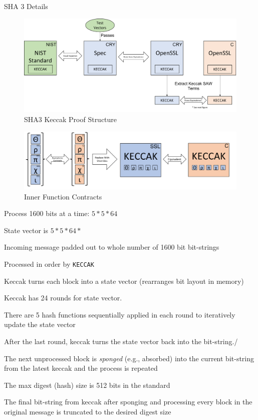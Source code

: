 SHA 3 Details
\begin{figure}[ht]
  \centering
  \includegraphics[width=\linewidth]{figs/proof.png}
  
  \caption{SHA3 Keccak Proof Structure}
  \label{fig:proofStructure}
  
\end{figure}
\begin{figure}[ht]
  \centering
  \includegraphics[width=\linewidth]{figs/proof2.png}
  
  \caption{Inner Function Contracts}
  \label{fig:proofStructure2}
  
\end{figure}

\begin{compactitem}
  \item Process 1600 bits at a time: $5 * 5 * 64$
  \item State vector is $5*5*64*$
  \item Incoming message padded out to whole number of 1600 bit bit-strings
  \item Processed in order by \texttt{KECCAK}
  \item Keccak turns each block into a state vector (rearranges bit layout in memory)
  \item Keccak has 24 rounds for state vector. 
  \item There are 5 hash functions sequentially applied in each round to iteratively update the state vector
  \item After the last round, keccak turns the state vector back into the bit-string./\item The next unprocessed block is \emph{sponged} (e.g., absorbed) into the current bit-string from the latest keccak and the process is repeated 
  \item The max digest (hash) size is 512 bits in the standard
  \item The final bit-string from keccak after sponging and processing every block in the original message is truncated to the desired digest size 
\end{compactitem}

